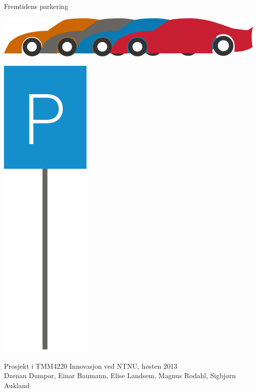 \documentclass[xetex]{beamer}
\begin{document}
\begin{frame}
	\vspace{6em}
	\begin{center}
		{\huge Fremtidens parkering}
	\end{center}
		
	\vspace{6em}
	\hspace{3em}\includegraphics[scale=0.5]{grafikk/forside_bil.pdf}

	\vspace{-14em}

	\hfill\includegraphics[scale=0.4]{grafikk/parkering.pdf}
	
	\small Prosjekt i TMM4220 Innovasjon ved NTNU, høsten 2013 \\ [0.1em]	  
	{ \alert{Dzenan Dumpor}, \alert{Einar Baumann}, \alert{Elise Landsem}, \alert{Magnus Rodahl}, \alert{Sigbjørn Aukland}}
  
  \thispagestyle{empty}
\end{frame}
\end{document}
